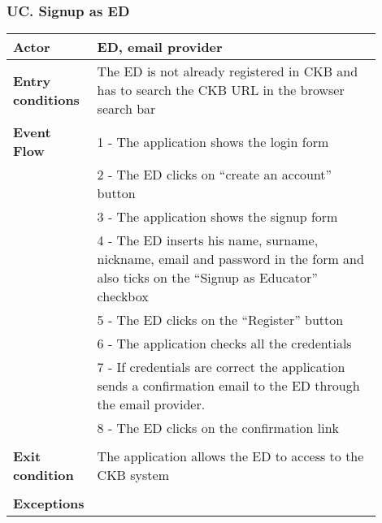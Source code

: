 \subsubsection*{UC\cuc . Signup as ED}
\begin{center}
    \begin{longtable}{|l|p{0.9\linewidth}|}
        \hline
        \textbf{Actor}            & ED, email provider                                                                                                                                                                                        \\
        \hline
        \textbf{Entry conditions} & The ED is not already registered in CKB and has to search the CKB URL in the browser search bar                                                                                                                   \\
        \hline
        \textbf{Event Flow}       & 1 - The application shows the login form  \\
        & 2 - The ED clicks on “create an account” button   \\
        & 3 - The application shows the signup form    \\
        & 4 - The ED inserts his name, surname, nickname, email and password in the form and also ticks on the “Signup as Educator” checkbox  \\
        & 5 - The ED clicks on the “Register” button  \\
        & 6 - The application checks all the credentials  \\
        & 7 - If credentials are correct the application sends a confirmation email to the ED through the email provider.  \\
        & 8 - The ED clicks on the confirmation link                                                                         \\                                                                                                                                                            \\
        \hline
        \textbf{Exit condition}   & The application allows the ED to access to the CKB system \\                                                                                                                                                                                \\
        \hline
        \textbf{Exceptions}       & \begin{itemize}

\end{itemize}
\end{longtable}
\end{center}
